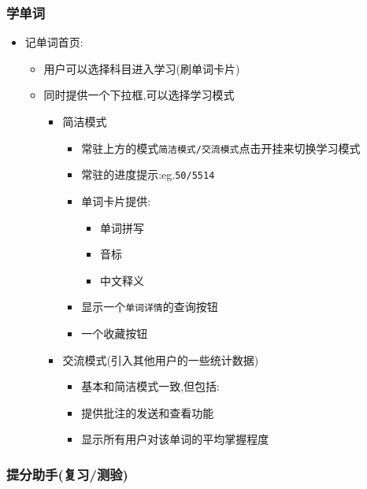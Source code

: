 \documentclass[
]{article}
\begin{document}
\hypertarget{ux5b66ux5355ux8bcd-1}{%
\subsubsection{学单词}\label{ux5b66ux5355ux8bcd-1}}

\begin{itemize}
\item
  记单词首页:

  \begin{itemize}
  \item
    用户可以选择科目进入学习(刷单词卡片)
  \item
    同时提供一个下拉框,可以选择学习模式

    \begin{itemize}
    \item
      简洁模式

      \begin{itemize}
      \item
        常驻上方的模式\texttt{简洁模式/交流模式}点击开挂来切换学习模式
      \item
        常驻的进度提示:eg.\texttt{50/5514}
      \item
        单词卡片提供:

        \begin{itemize}
        \item
          单词拼写
        \item
          音标
        \item
          中文释义
        \end{itemize}
      \item
        显示一个\texttt{单词详情}的查询按钮
      \item
        一个收藏按钮
      \end{itemize}
    \item
      交流模式(引入其他用户的一些统计数据)

      \begin{itemize}
      \item
        基本和简洁模式一致,但包括:
      \item
        提供批注的发送和查看功能
      \item
        显示所有用户对该单词的平均掌握程度
      \end{itemize}
    \end{itemize}
  \end{itemize}
\end{itemize}

\hypertarget{ux63d0ux5206ux52a9ux624bux590dux4e60ux6d4bux9a8c}{%
\subsubsection{提分助手(复习/测验)}\label{ux63d0ux5206ux52a9ux624bux590dux4e60ux6d4bux9a8c}}
\end{document}
